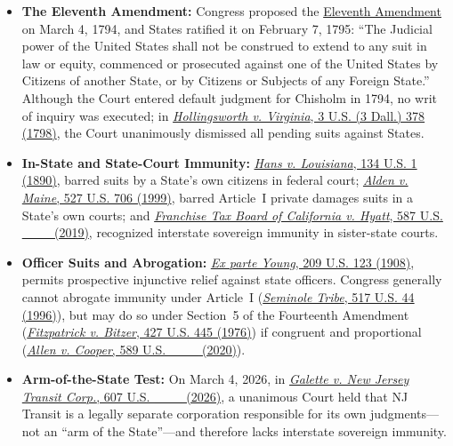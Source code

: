 \documentclass[12pt]{article}
\begin{document}
\begin{itemize}

\item \textbf{The Eleventh Amendment:} Congress proposed the \href{https://www.law.cornell.edu/constitution-conan/amendment-11/historical-background-on-eleventh-amendment}{Eleventh Amendment} on March 4, 1794, and States ratified it on February 7, 1795: ``The Judicial power of the United States shall not be construed to extend to any suit in law or equity, commenced or prosecuted against one of the United States by Citizens of another State, or by Citizens or Subjects of any Foreign State.'' Although the Court entered default judgment for Chisholm in 1794, no writ of inquiry was executed; in \href{https://supreme.justia.com/cases/federal/us/3/378/}{\emph{Hollingsworth v. Virginia}, 3 U.S. (3 Dall.) 378 (1798)}, the Court unanimously dismissed all pending suits against States.

\item \textbf{In-State and State-Court Immunity:} \href{https://supreme.justia.com/cases/federal/us/134/1/}{\emph{Hans v. Louisiana}, 134 U.S. 1 (1890)}, barred suits by a State's own citizens in federal court; \href{https://supreme.justia.com/cases/federal/us/527/706/}{\emph{Alden v. Maine}, 527 U.S. 706 (1999)}, barred Article~I private damages suits in a State's own courts; and \href{https://supreme.justia.com/cases/federal/us/587/17-1299/}{\emph{Franchise Tax Board of California v. Hyatt}, 587 U.S. \_\_\_ (2019)}, recognized interstate sovereign immunity in sister-state courts.
  \item \textbf{Officer Suits and Abrogation:} \href{https://supreme.justia.com/cases/federal/us/209/123/}{\emph{Ex parte Young}, 209 U.S. 123 (1908)}, permits prospective injunctive relief against state officers. Congress generally cannot abrogate immunity under Article~I (\href{https://supreme.justia.com/cases/federal/us/517/44/}{\emph{Seminole Tribe}, 517 U.S. 44 (1996)}), but may do so under Section~5 of the Fourteenth Amendment (\href{https://supreme.justia.com/cases/federal/us/427/445/}{\emph{Fitzpatrick v. Bitzer}, 427 U.S. 445 (1976)}) if congruent and proportional (\href{https://supreme.justia.com/cases/federal/us/589/18-877/}{\emph{Allen v. Cooper}, 589 U.S. \_\_\_ (2020)}).

\item \textbf{Arm-of-the-State Test:} On March 4, 2026, in \href{https://supreme.justia.com/cases/federal/us/607/24-1021/}{\emph{Galette v. New Jersey Transit Corp.}, 607 U.S. \_\_\_ (2026)}, a unanimous Court held that NJ Transit is a legally separate corporation responsible for its own judgments---not an ``arm of the State''---and therefore lacks interstate sovereign immunity.

\end{itemize}
\end{document}
